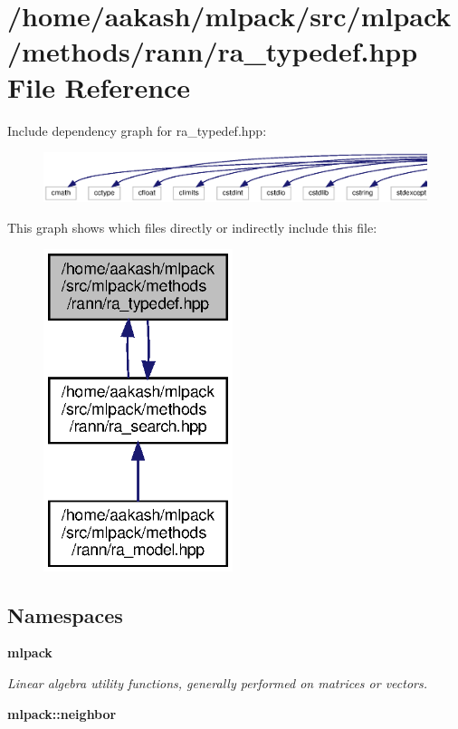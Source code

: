 \section{/home/aakash/mlpack/src/mlpack/methods/rann/ra\+\_\+typedef.hpp File Reference}
\label{ra__typedef_8hpp}
Include dependency graph for ra\+\_\+typedef.\+hpp\+:
\nopagebreak
\begin{figure}[H]
\begin{center}
\leavevmode
\includegraphics[width=350pt]{ra__typedef_8hpp__incl}
\end{center}
\end{figure}
This graph shows which files directly or indirectly include this file\+:
\nopagebreak
\begin{figure}[H]
\begin{center}
\leavevmode
\includegraphics[width=157pt]{ra__typedef_8hpp__dep__incl}
\end{center}
\end{figure}
\subsection*{Namespaces}
\begin{DoxyCompactItemize}
\item 
 \textbf{ mlpack}
\begin{DoxyCompactList}\small\item\em Linear algebra utility functions, generally performed on matrices or vectors. \end{DoxyCompactList}\item 
 \textbf{ mlpack\+::neighbor}
\end{DoxyCompactItemize}
